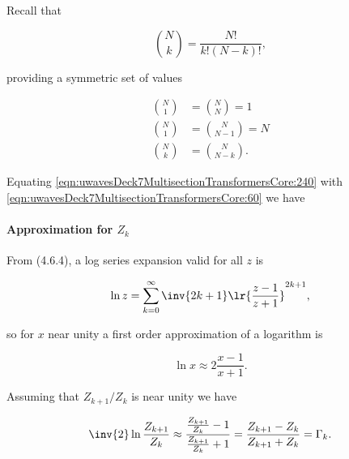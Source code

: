 Recall that 

\begin{equation}\label{eqn:uwavesDeck7MultisectionTransformersCore:260}
\binom{N}{k} = \frac{N!}{k! (N-k)!},
\end{equation}

providing a symmetric set of values

\begin{equation}\label{eqn:uwavesDeck7MultisectionTransformersCore:280}
\begin{aligned}
\binom{N}{1} &= \binom{N}{N} = 1 \\
\binom{N}{1} &= \binom{N}{N-1} = N \\
\binom{N}{k} &= \binom{N}{N-k}.
\end{aligned}
\end{equation}

Equating \cref{eqn:uwavesDeck7MultisectionTransformersCore:240} with \cref{eqn:uwavesDeck7MultisectionTransformersCore:60} we have


\paragraph{Approximation for \( Z_k \)}

From \citep{NIST:DLMF} (4.6.4), a log series expansion valid for all \( z \) is

\begin{equation}\label{eqn:uwavesDeck7MultisectionTransformersCore:320}
\ln z = \sum_{k = 0}^\infty \inv{2 k + 1} \lr{ \frac{ z - 1 }{z + 1} }^{2k + 1},
\end{equation}

so for \( x \) near unity a first order approximation of a logarithm is

\begin{equation}\label{eqn:uwavesDeck7MultisectionTransformersCore:340}
\ln x \approx 2 \frac{x -1}{x+1}.
\end{equation}

Assuming that \( Z_{k+1}/Z_k \) is near unity we have

\begin{dmath}\label{eqn:uwavesDeck7MultisectionTransformersCore:360}
\inv{2} \ln \frac{Z_{k+1}}{Z_k} 
\approx
\frac{ \frac{Z_{k+1}}{Z_k} - 1 }{\frac{Z_{k+1}}{Z_k} + 1}
=
\frac{ Z_{k+1} - Z_k }{Z_{k+1} + Z_k}
=
\Gamma_k.
\end{dmath}


